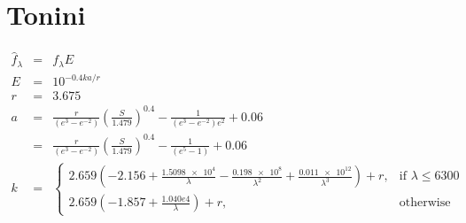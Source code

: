 \documentclass[12pt]{scrartcl}
\begin{document}
\maketitle

\section{Tonini}

\begin{eqnarray*}
  \hat{f}_\lambda &=& f_\lambda E \\
  E &=& 10^{-0.4ka/r} \\
  r &=& 3.675 \\
  a &=& \frac{r}{\left(e^3 - e^{-2}\right)}\left(\frac{S}{1.479}\right)^{0.4} - \frac{1}{\left(e^3 - e^{-2}\right)e^2} + 0.06 \\
    &=& \frac{r}{\left(e^3 - e^{-2}\right)}\left(\frac{S}{1.479}\right)^{0.4} - \frac{1}{\left(e^5 - 1\right)} + 0.06 \\
  k &=& 
  \begin{cases}
    2.659\left(-2.156 + \frac{\num{1.5098e4}}{\lambda} - \frac{\num{0.198e8}}{\lambda^2} + \frac{\num{0.011e12}}{\lambda^3}\right) + r,& \text{if } \lambda \le 6300 \\
    2.659\left(-1.857 + \frac{1.040e4}{\lambda}\right) + r, & \text{otherwise}
  \end{cases}
\end{eqnarray*}
\end{document}
